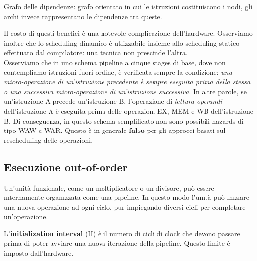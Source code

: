 \begin{figure}[ht]
    \centering
    \setlength{\fboxrule}{0.5pt} %
    \setlength{\fboxsep}{0pt}    %
\end{figure}

\begin{info}
    Grafo delle dipendenze: grafo orientato in cui le istruzioni costituiscono i nodi, gli archi invece rappresentano le dipendenze tra queste.
\end{info}

Il costo di questi benefici è una notevole complicazione dell'hardware. Osserviamo inoltre che lo scheduling dinamico è utlizzabile insieme allo scheduling statico effettuato dal compilatore: una tecnica non prescinde l'altra. \\ \noindent
Osserviamo che in uno schema pipeline a cinque stages di base, dove non contempliamo istruzioni fuori ordine, è verificata sempre la condizione: \textit{una micro-operazione di un'istruzione precedente è sempre eseguita prima della stessa o una successiva micro-operazione di un'istruzione successiva}. In altre parole, se un'istruzione A precede un'istruzione B, l'operazione di \textit{lettura operandi} dell'istruzione A è eseguita prima delle operazioni EX, MEM e WB dell'istruzione B. Di conseguenza, in questo schema semplificato non sono possibili hazards di tipo WAW e WAR. 
Questo è in generale \textbf{falso} per gli approcci basati sul rescheduling delle operazioni. 

\subsection{Esecuzione out-of-order}
Un'unità funzionale, come un moltiplicatore o un divisore, può essere internamente organizzata come una pipeline. In questo modo l'unità può iniziare una nuova operazione ad ogni ciclo, pur impiegando diversi cicli per completare un'operazione. 

\begin{info}
    L'\textbf{initialization interval} (II) è il numero di cicli di clock che devono passare prima di poter avviare una nuova iterazione della pipeline. Questo limite è imposto dall'hardware.
\end{info}

